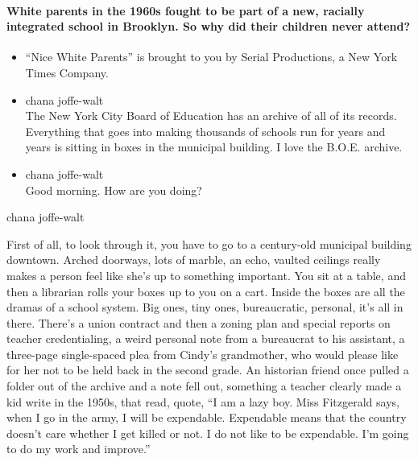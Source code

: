 \hypertarget{white-parents-in-the-1960s-fought-to-be-part-of-a-new-racially-integrated-school-in-brooklyn-so-why-did-their-children-never-attend}{%
\paragraph{White parents in the 1960s fought to be part of a new,
racially integrated school in Brooklyn. So why did their children never
attend?}\label{white-parents-in-the-1960s-fought-to-be-part-of-a-new-racially-integrated-school-in-brooklyn-so-why-did-their-children-never-attend}}

\begin{itemize}
\item
  ``Nice White Parents'' is brought to you by Serial Productions, a New
  York Times Company.
\item
  chana joffe-walt\\
  The New York City Board of Education has an archive of all of its
  records. Everything that goes into making thousands of schools run for
  years and years is sitting in boxes in the municipal building. I love
  the B.O.E. archive.
\item
  chana joffe-walt\\
  Good morning. How are you doing?
\end{itemize}

chana joffe-walt

First of all, to look through it, you have to go to a century-old
municipal building downtown. Arched doorways, lots of marble, an echo,
vaulted ceilings really makes a person feel like she's up to something
important. You sit at a table, and then a librarian rolls your boxes up
to you on a cart. Inside the boxes are all the dramas of a school
system. Big ones, tiny ones, bureaucratic, personal, it's all in there.
There's a union contract and then a zoning plan and special reports on
teacher credentialing, a weird personal note from a bureaucrat to his
assistant, a three-page single-spaced plea from Cindy's grandmother, who
would please like for her not to be held back in the second grade. An
historian friend once pulled a folder out of the archive and a note fell
out, something a teacher clearly made a kid write in the 1950s, that
read, quote, ``I am a lazy boy. Miss Fitzgerald says, when I go in the
army, I will be expendable. Expendable means that the country doesn't
care whether I get killed or not. I do not like to be expendable. I'm
going to do my work and improve.''

